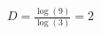 \documentclass[preview]{standalone}
\begin{document}
\begin{align*}
D = \frac{\log(9)}{\log(3)} = 2
\end{align*}
\end{document}
